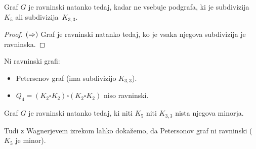\begin{izrek}[Kuratowski]
    Graf $G$ je ravninski natanko tedaj, kadar ne vsebuje podgrafa, ki je subdivizija $K_5$ ali subdivizija~$K_{3,3}$.
\end{izrek}

\begin{proof}
    $(\Rightarrow)$ Graf je ravninski natanko tedaj, ko je vsaka njegova subdivizija je ravninska.
\end{proof}

\begin{primer}
    Ni ravninski grafi:
    \begin{itemize}
        \item Petersenov graf (ima subdivizijo $K_{3,3}$).
        \item $Q_4 = (K_2 \square K_2) \square (K_2 \square K_2)$ niso ravninski.
    \end{itemize}
\end{primer}

\begin{izrek}[Wagner]
    Graf $G$ je ravninski natanko tedaj, ki niti $K_5$ niti $K_{3,3}$ nista njegova minorja.
\end{izrek}

\begin{primer}
    Tudi z Wagnerjevem izrekom lahko dokažemo, da Petersonov graf ni ravninski ($K_5$ je minor). 
\end{primer}